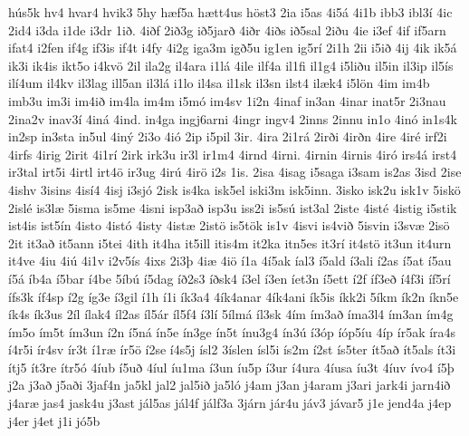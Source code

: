 {h^^fas5k
hv4
hvar4
hvik3
5hy
h^^e6f5a
h^^e6tt4us
h^^f6st3
2ia
i5as
4i5^^e1
4i1b
ibb3
ibl3^^ed
4ic
2id4
i3da
i1de
i3dr
1i^^f0.
4i^^f0f
2i^^f03g
i^^f05jar^^f0
4i^^f0r
4i^^f0s
i^^f05sal
2i^^f0u
4ie
i3ef
4if
if5arn
ifat4
i2fen
if4g
if3is
if4t
i4fy
4i2g
iga3m
ig^^f05u
ig1en
ig5r^^ed
2i1h
2ii
i5i^^f0
4ij
4ik
ik5^^e1
ik3i
ik4is
ikt5o
i4kv^^f6
2il
ila2g
il4ara
i1l^^e1
4ile
ilf4a
il1fi
il1g4
i5li^^f0u
il5in
il3ip
il5^^eds
il^^ed4um
il4kv
il3lag
ill5an
il3l^^e1
i1lo
il4sa
il1sk
il3sn
ilst4
il^^e6k4
i5l^^f6n
4im
im4b
imb3u
im3i
im4i^^f0
im4la
im4m
i5m^^f3
im4sv
1i2n
4inaf
in3an
4inar
inat5r
2i3nau
2ina2v
inav3^^ed
4in^^e1
4ind.
in4ga
ingj6arni
4ingr
ingv4
2inns
2innu
in1o
4in^^f3
in1s4k
in2sp
in3sta
in5ul
4in^^fd
2i3o
4i^^f3
2ip
i5pil
3ir.
4ira
2i1r^^e1
2ir^^f0i
4ir^^f0n
4ire
4ir^^e9
irf2i
4irfs
4irig
2irit
4i1r^^ed
2irk
irk3u
ir3l
ir1m4
4irnd
4irni.
4irnin
4irnis
4ir^^f3
irs4^^e1
irst4
ir3tal
irt5i
4irtl
irt4^^f6
ir3ug
4ir^^fa
4ir^^f6
i2s
1is.
2isa
4isag
i5saga
i3sam
is2as
3isd
2ise
4ishv
3isins
4is^^ed4
4isj
i3sj^^f3
2isk
is4ka
isk5el
iski3m
isk5inn.
3isko
isk2u
isk1v
5isk^^f6
2isl^^e9
is3l^^e6
5isma
is5me
4isni
isp3a^^f0
isp3u
iss2i
is5s^^fa
ist3al
2iste
4ist^^e9
4istig
i5stik
ist4is
ist5^^edn
4isto
4ist^^f3
4isty
4ist^^e6
2ist^^f6
is5t^^f6k
is1v
4isvi
is4vi^^f0
5isvin
i3sv^^e6
2is^^f6
2it
it3a^^f0
it5ann
i5tei
4ith
it4ha
it5ill
itis4m
it2ka
itn5es
it3r^^ed
it4st^^f6
it3un
it4urn
it4ve
4iu
4i^^fa
4i1v
i2v5^^eds
4ixs
2i3^^fe
4i^^e6
4i^^f6
^^ed1a
4^^ed5ak
^^edal3
^^ed5ald
^^ed3ali
^^ed2as
^^ed5at
^^ed5au
^^ed5^^e1
^^edb4a
^^ed5bar
^^ed4be
5^^edb^^fa
^^ed5dag
^^ed^^f02s3
^^ed^^f0sk4
^^ed3el
^^ed3en
^^edet3n
^^ed5ett
^^ed2f
^^edf3e^^f0
^^ed4f3i
^^edf5r^^ed
^^edfs3k
^^edf4sp
^^ed2g
^^edg3e
^^ed3gil
^^ed1h
^^ed1i
^^edk3a4
4^^edk4anar
4^^edk4ani
^^edk5is
^^edkk2i
5^^edkm
^^edk2n
^^edkn5e
^^edk4s
^^edk3us
2^^edl
^^edlak4
^^edl2as
^^edl5^^e1r
^^edl5f4
^^ed3l^^ed
5^^edlm^^e1
^^edl3sk
4^^edm
^^edm3a^^f0
^^edma3l4
^^edm3an
^^edm4g
^^edm5o
^^edm5t
^^edm3un
^^ed2n
^^ed5n^^e1
^^edn5e
^^edn3ge
^^edn5t
^^ednu3g4
^^edn3^^fa
^^ed3^^f3p
^^ed^^f3p5^^edu
4^^edp
^^edr5ak
^^edra4s
^^ed4r5i
^^edr4sv
^^edr3t
^^ed1r^^e6
^^edr5^^f6
^^ed2se
^^ed4s5j
^^edsl2
3^^edslen
^^edsl5i
^^eds2m
^^ed2st
^^eds5ter
^^edt5a^^f0
^^edt5als
^^edt3i
^^edtj5
^^edt3re
^^edtr5^^f3
4^^edub
^^ed5u^^f0
4^^edul
^^edu1ma
^^ed3un
^^edu5p
^^ed3ur
^^ed4ura
4^^edusa
^^edu3t
4^^eduv
^^edvo4
^^ed5^^fe
j2a
j3a^^f0
j5a^^f0i
3jaf4n
ja5kl
jal2
jal5i^^f0
ja5l^^f3
j4am
j3an
j4aram
j3ari
jark4i
jarn4i^^f0
j4ar^^e6
jas4
jask4u
j3ast
j^^e1l5as
j^^e1l4f
j^^e1lf3a
3j^^e1rn
j^^e1r4u
j^^e1v3
j^^e1var5
j1e
jend4a
j4ep
j4er
j4et
j1i
j^^f35b
}
